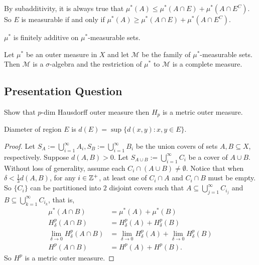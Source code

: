 \documentclass[class=book, crop=false]{standalone}
\begin{document}
        \begin{remark}
            By subadditivity, it is always true that $\mu^*(A) \leq \mu^*(A \cap E) + \mu^*(A \cap E^C)$. So $E$ is measurable if and only if $\mu^*(A) \geq \mu^*(A \cap E) + \mu^*(A \cap E^C)$.
        \end{remark}

        \begin{theorem}
            $\mu^*$ is finitely additive on $\mu^*$-measurable sets.
        \end{theorem}

        \begin{theorem}
            Let $\mu^*$ be an outer measure in $X$ and let $\mathscr{M}$ be the family of $\mu^*$-measurable sets. Then $\mathscr{M}$ is a $\sigma$-algebra and the restriction of $\mu^*$ to $\mathscr{M}$ is a complete measure.
        \end{theorem}
        
        \subsection{Presentation Question}
        \begin{question}
            Show that $p$-dim Hausdorff outer measure then $H_p$ is a metric outer measure.
        \end{question}
        
        \begin{definition}[Diameter]
            Diameter of region $E$ is $d(E) = \sup\{d(x, y) : x, y \in E\}$.
        \end{definition}

        \begin{proof}
            Let $S_A := \bigcup^{\infty}_{i = 1} A_i, S_B := \bigcup^{\infty}_{i = 1} B_i$ be the union covers of sets $A, B \subseteq X$, respectively. Suppose $d(A, B) > 0$. Let $S_{A \cup B} := \bigcup^{\infty}_{i = 1} C_i$ be a cover of $A \cup B$. Without loss of generality, assume each $C_i \cap (A \cup B) \neq \emptyset$. Notice that when $\delta < \frac{1}{3} d(A, B)$, for any $i \in \mathbb{Z}^+$, at least one of $C_i \cap A$ and $C_i \cap B$ must be empty. So $\{C_i\}$ can be partitioned into $2$ disjoint covers such that $A \subseteq \bigcup^{\infty}_{j = 1} C_{i_j}$ and $B \subseteq \bigcup^{\infty}_{k = 1} C_{i_k}$, that is,
            \begin{align*}
                \mu^*(A \cap B) &= \mu^*(A) + \mu^*(B) \\
                H^p_{\delta}(A \cap B) &= H^p_{\delta}(A) + H^p_{\delta}(B) \\
                \lim_{\delta \rightarrow 0} H^p_{\delta}(A \cap B) &= \lim_{\delta \rightarrow 0} H^p_{\delta}(A) + \lim_{\delta \rightarrow 0} H^p_{\delta}(B) \\
                H^p(A \cap B) &= H^p(A) + H^p(B).
            \end{align*}
            So $H^p$ is a metric outer measure.
        \end{proof}
\end{document}
